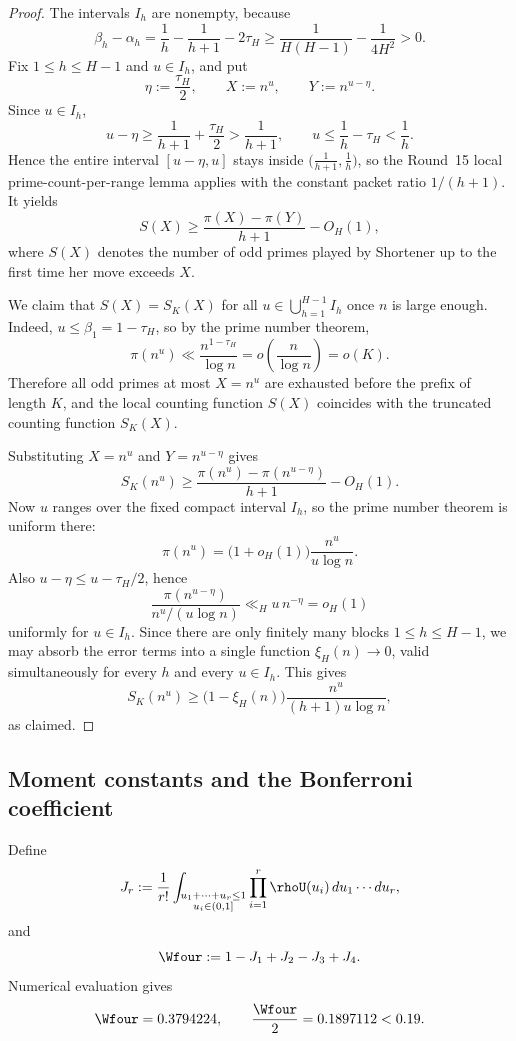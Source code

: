 \begin{proof}
The intervals $I_h$ are nonempty, because
\[
  \beta_h-\alpha_h
  =
  \frac1h-\frac1{h+1}-2\tau_H
  \ge
  \frac{1}{H(H-1)}-\frac{1}{4H^2}
  >
  0.
\]
Fix $1\le h\le H-1$ and $u\in I_h$, and put
\[
  \eta := \frac{\tau_H}{2},
  \qquad
  X := n^u,
  \qquad
  Y := n^{u-\eta}.
\]
Since $u\in I_h$,
\[
  u-\eta \ge \frac{1}{h+1}+\frac{\tau_H}{2} > \frac{1}{h+1},
  \qquad
  u \le \frac1h-\tau_H < \frac1h.
\]
Hence the entire interval $[u-\eta,u]$ stays inside
$\bigl(\frac{1}{h+1},\frac1h\bigr)$, so the Round~15 local
prime-count-per-range lemma applies with the constant packet ratio
$1/(h+1)$.  It yields
\[
  S(X)
  \ge
  \frac{\pi(X)-\pi(Y)}{h+1}-O_H(1),
\]
where $S(X)$ denotes the number of odd primes played by Shortener up to the
first time her move exceeds $X$.

We claim that $S(X)=S_K(X)$ for all $u\in\bigcup_{h=1}^{H-1}I_h$ once $n$ is
large enough.  Indeed, $u\le \beta_1=1-\tau_H$, so by the prime number theorem,
\[
  \pi(n^u)
  \ll \frac{n^{1-\tau_H}}{\log n}
  =
  o\!\left(\frac{n}{\log n}\right)
  =
  o(K).
\]
Therefore all odd primes at most $X=n^u$ are exhausted before the prefix of
length $K$, and the local counting function $S(X)$ coincides with the truncated
counting function $S_K(X)$.

Substituting $X=n^u$ and $Y=n^{u-\eta}$ gives
\[
  S_K(n^u)
  \ge
  \frac{\pi(n^u)-\pi(n^{u-\eta})}{h+1}-O_H(1).
\]
Now $u$ ranges over the fixed compact interval $I_h$, so the prime number
theorem is uniform there:
\[
  \pi(n^u)=\bigl(1+o_H(1)\bigr)\frac{n^u}{u\log n}.
\]
Also $u-\eta\le u-\tau_H/2$, hence
\[
  \frac{\pi(n^{u-\eta})}{n^u/(u\log n)}
  \ll_H
  u\,n^{-\eta}
  =
  o_H(1)
\]
uniformly for $u\in I_h$.  Since there are only finitely many blocks
$1\le h\le H-1$, we may absorb the error terms into a single function
$\xi_H(n)\to 0$, valid simultaneously for every $h$ and every $u\in I_h$.
This gives
\[
  S_K(n^u)
  \ge
  \bigl(1-\xi_H(n)\bigr)\frac{n^u}{(h+1)u\log n},
\]
as claimed.
\end{proof}

\subsection{Moment constants and the Bonferroni coefficient}

Define
\[
  J_r
  :=
  \frac1{r!}
  \int_{\substack{u_1+\cdots+u_r\le 1\\u_i\in(0,1]}}
  \prod_{i=1}^r \rhoU(u_i)\,du_1\cdots du_r,
\]
and
\[
  \Wfour := 1-J_1+J_2-J_3+J_4.
\]
Numerical evaluation gives
\[
  \Wfour = 0.3794224,
  \qquad
  \frac{\Wfour}{2} = 0.1897112 < 0.19.
\]

